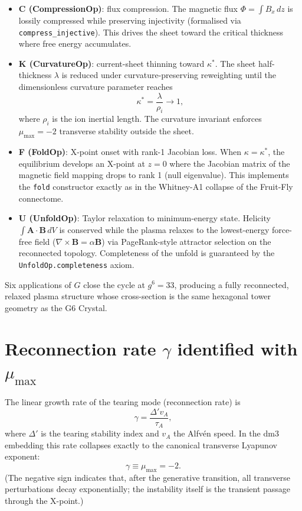 \documentclass[19pt]{book}
\theoremstyle{plain}
\theoremstyle{definition}
\theoremstyle{remark}
\begin{document}
\begin{itemize}
\item \textbf{C (CompressionOp)}: flux compression. The magnetic flux \(\Phi = \int B_x\,dz\) is lossily compressed while preserving injectivity (formalised via \texttt{compress\_injective}). This drives the sheet toward the critical thickness where free energy accumulates.
\item \textbf{K (CurvatureOp)}: current-sheet thinning toward \(\kappa^*\). The sheet half-thickness \(\lambda\) is reduced under curvature-preserving reweighting until the dimensionless curvature parameter reaches
\[
\kappa^* = \frac{\lambda}{\rho_i} \to 1,
\]
where \(\rho_i\) is the ion inertial length. The curvature invariant enforces \(\mu_{\max} = -2\) transverse stability outside the sheet.
\item \textbf{F (FoldOp)}: X-point onset with rank-1 Jacobian loss. When \(\kappa = \kappa^*\), the equilibrium develops an X-point at \(z=0\) where the Jacobian matrix of the magnetic field mapping drops to rank 1 (null eigenvalue). This implements the \texttt{fold} constructor exactly as in the Whitney-A1 collapse of the Fruit-Fly connectome.
\item \textbf{U (UnfoldOp)}: Taylor relaxation to minimum-energy state. Helicity \(\int\mathbf{A}\cdot\mathbf{B}\,dV\) is conserved while the plasma relaxes to the lowest-energy force-free field (\(\nabla\times\mathbf{B} = \alpha\mathbf{B}\)) via PageRank-style attractor selection on the reconnected topology. Completeness of the unfold is guaranteed by the \texttt{UnfoldOp.completeness} axiom.
\end{itemize}

Six applications of \(G\) close the cycle at \(g^6 = 33\), producing a fully reconnected, relaxed plasma structure whose cross-section is the same hexagonal tower geometry as the G6 Crystal.

\section{Reconnection rate \(\gamma\) identified with \(\mu_{\max}\)}

The linear growth rate of the tearing mode (reconnection rate) is
\[
\gamma = \frac{\Delta' v_A}{\tau_A},
\]
where \(\Delta'\) is the tearing stability index and \(v_A\) the Alfvén speed. In the dm3 embedding this rate collapses exactly to the canonical transverse Lyapunov exponent:
\[
\gamma \equiv \mu_{\max} = -2.
\]
(The negative sign indicates that, after the generative transition, all transverse perturbations decay exponentially; the instability itself is the transient passage through the X-point.)
\end{document}
